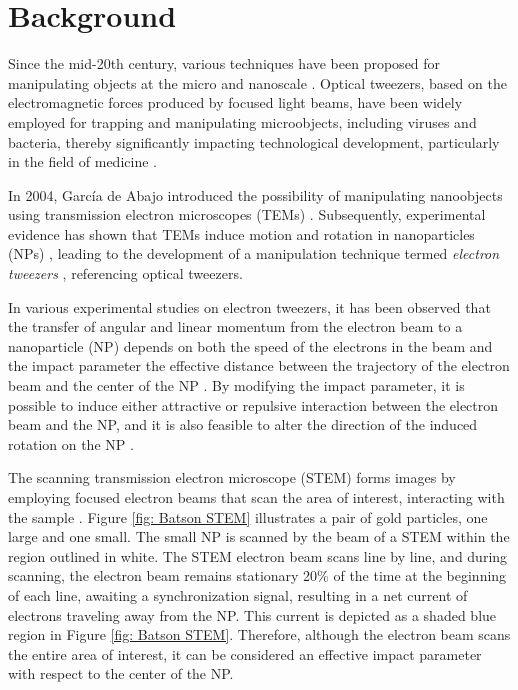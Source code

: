 \label{cap: introduccion}
\section{Background}
Since the mid-20th century, various techniques have been proposed for manipulating objects at the micro and nanoscale \cite{ashkin1970acceleration, ashkin1987optical, Ashkin, custance2009atomic, dholakia2011shaping, marago2013optical, romo2020controlled}. Optical tweezers, based on the electromagnetic forces produced by focused light beams, have been widely employed for trapping and manipulating microobjects, including viruses and bacteria, thereby significantly impacting technological development, particularly in the field of medicine \cite{ashkin1970acceleration, ashkin1987optical, Ashkin}.

In 2004, García de Abajo introduced the possibility of manipulating nanoobjects using transmission electron microscopes (TEMs) \cite{GarciadeAbajo0}. Subsequently, experimental evidence has shown that TEMs induce motion and rotation in nanoparticles (NPs) \cite{Batson01, zheng2012electron}, leading to the development of a manipulation technique termed \textit{electron tweezers} \cite{Batson, oleshko2005electron, Oleshko}, referencing optical tweezers.

In various experimental studies on electron tweezers, it has been observed that the transfer of angular and linear momentum from the electron beam to a nanoparticle (NP) depends on both the speed of the electrons in the beam and the impact parameter \textemdash the effective distance between the trajectory of the electron beam and the center of the NP \cite{OLESHKO2013203, Oleshko, Batson, Batson01, zheng2012electron, xu2010transmission}. By modifying the impact parameter, it is possible to induce either attractive or repulsive interaction between the electron beam and the NP, and it is also feasible to alter the direction of the induced rotation on the NP \cite{OLESHKO2013203, Batson, Oleshko}.

The scanning transmission electron microscope (STEM) forms images by employing focused electron beams that scan the area of interest, interacting with the sample \cite{Batson}. Figure \ref{fig: Batson STEM} illustrates a pair of gold particles, one large and one small. The small NP is scanned by the beam of a STEM within the region outlined in white. The STEM electron beam scans line by line, and during scanning, the electron beam remains stationary 20\% of the time at the beginning of each line, awaiting a synchronization signal, resulting in a net current of electrons traveling away from the NP. This current is depicted as a shaded blue region in Figure \ref{fig: Batson STEM}. Therefore, although the electron beam scans the entire area of interest, it can be considered an effective impact parameter with respect to the center of the NP.

